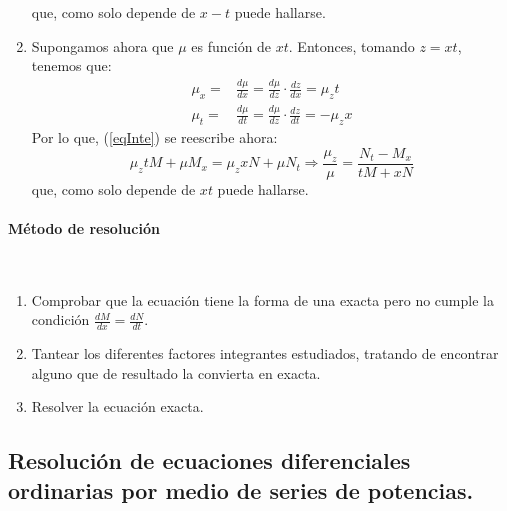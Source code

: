 \documentclass{article}
\theoremstyle{theorem-style}  %
\theoremstyle{definition-style}
\theoremstyle{example-style}
\begin{document}
\begin{enumerate}
	que, como solo depende de $x-t$ puede hallarse.
	\item Supongamos ahora que $\mu$ es función de $xt$. Entonces, tomando $z=xt$, tenemos que:
	\begin{align*}
	\mu_x = & \frac{d\mu}{dx} = \frac{d\mu}{dz} \cdot \frac{dz}{dx} = \mu_zt \\
	\mu_t = & \frac{d\mu}{dt} = \frac{d\mu}{dz} \cdot \frac{dz}{dt} = -\mu_zx 
	\end{align*}
	Por lo que, (\ref{eqInte}) se reescribe ahora:
	\[\mu_z tM + \mu M_x = \mu_z xN + \mu N_t \Rightarrow \frac{\mu_z}{\mu} = \frac{N_t - M_x}{tM + xN}\]
	que, como solo depende de $xt$ puede hallarse.
\end{enumerate}

\paragraph{Método de resolución} \ 
\begin{enumerate}
	\item Comprobar que la ecuación tiene la forma de una exacta pero no cumple la condición  $\frac{dM}{dx} = \frac{dN}{dt}$.
	\item Tantear los diferentes factores integrantes estudiados, tratando de encontrar alguno que de resultado la convierta en exacta.
	\item Resolver la ecuación exacta.
\end{enumerate}

\subsection{Resolución de ecuaciones diferenciales ordinarias por medio de series de potencias.}

\pagebreak
\end{document}
